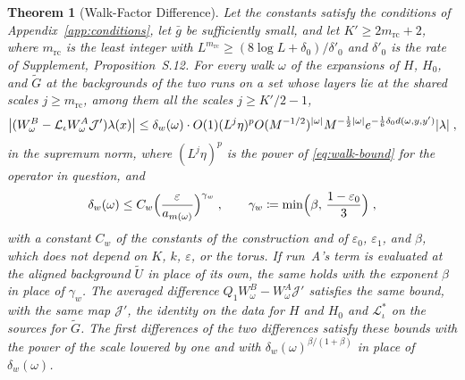 \documentclass[11pt]{preprint}
\DeclarePairedDelimiter{\abs}{\lvert}{\rvert}
\numberwithin{equation}{section}
\newtheorem{theorem}{Theorem}[section]
\theoremstyle{definition}
\theoremstyle{remark}
\theoremstyle{plain}
\begin{document}
\begin{theorem}[Walk-Factor Difference]\label{thm:walk-difference}
Let the constants satisfy the conditions of Appendix~\ref{app:conditions}, let $\bar g$ be sufficiently small, and let $K' \geq 2m_{\mathrm{rc}} + 2$, where $m_{\mathrm{rc}}$ is the least integer with $L^{m_{\mathrm{rc}}} \geq (8\log L + \delta_0)/\delta'_0$ and $\delta'_0$ is the rate of Supplement, Proposition~S.12. For every walk $\omega$ of the expansions of $H$, $H_0$, and $\tilde G$ at the backgrounds of the two runs on a set whose layers lie at the shared scales $j \geq m_{\mathrm{rc}}$, among them all the scales $j \geq K'/2 - 1$,
\begin{equation}\label{eq:walk-difference}
    \bigl\lvert(W^B_\omega - \mathcal L_\iota W^A_\omega\mathcal J')\lambda(x)\bigr\rvert \leq \delta_w(\omega)\cdot O(1)(L^j\eta)^pO(M^{-1/2})^{\abs{\omega}}M^{-\frac12\abs{\omega}}e^{-\frac16\delta_0d(\omega, y, y')}\abs{\lambda}\;,
\end{equation}
in the supremum norm, where $(L^j\eta)^p$ is the power of \eqref{eq:walk-bound} for the operator in question, and
\begin{equation}\label{eq:walk-defect}
    \delta_w(\omega) \leq C_w\Bigl(\frac{\varepsilon}{a_{m(\omega)}}\Bigr)^{\gamma_w}\;,
    \qquad
    \gamma_w \coloneqq \min\Bigl(\beta,\, \frac{1 - \varepsilon_0}{3}\Bigr)\;,
\end{equation}
with a constant $C_w$ of the constants of the construction and of $\varepsilon_0$, $\varepsilon_1$, and $\beta$, which does not depend on $K$, $k$, $\varepsilon$, or the torus. If run~A's term is evaluated at the aligned background $\tilde U$ in place of its own, the same holds with the exponent $\beta$ in place of $\gamma_w$. The averaged difference $Q_1W^B_\omega - W^A_\omega\mathcal J'$ satisfies the same bound, with the same map $\mathcal J'$, the identity on the data for $H$ and $H_0$ and $\mathcal L_\iota^*$ on the sources for $\tilde G$. The first differences of the two differences satisfy these bounds with the power of the scale lowered by one and with $\delta_w(\omega)^{\beta/(1+\beta)}$ in place of $\delta_w(\omega)$.
\end{theorem}
\end{document}
